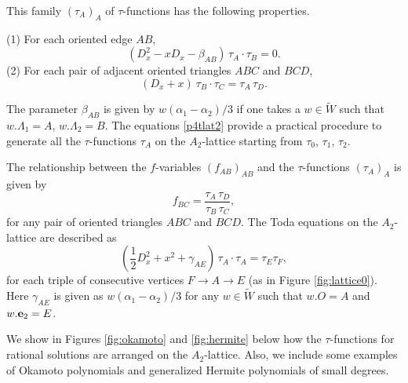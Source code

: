 {This family $(\tau_A)_{A}$ of $\tau$-functions has the 
following properties. 
\par\medskip\noindent
(1) For each oriented edge $AB$,
\begin{equation}\label{p4tlat1}
\left(D_x^2-xD_x-\beta_{AB}\right)
\,\tau_A\cdot \tau_B=0. 
\end{equation}
(2) For each pair of adjacent oriented triangles $ABC$ and 
$BCD$,  
\begin{equation}\label{p4tlat2}
(D_x+x) \ \tau_B\cdot\tau_C =\tau_A\,\tau_{D}. 
\end{equation}
\par\smallskip\noindent 
The parameter $\beta_{AB}$ is given by 
$w(\alpha_1-\alpha_2)/3$ if one takes a 
$w\in\widetilde{W}$ such that $w.\Lambda_1=A$, 
$w.\Lambda_2=B$. 
The equations \eqref{p4tlat2} provide a practical procedure 
to generate all the $\tau$-functions $\tau_A$ on 
the $A_2$-lattice starting from $\tau_0$, $\tau_1$, $\tau_2$. 
\par\medskip
The relationship between the $f$-variables $(f_{AB})_{AB}$ and 
the $\tau$-functions $(\tau_A)_{A}$ is given by 
\begin{equation}
f_{BC}=\frac{\tau_A\,\tau_{D}}{\tau_{B}\,\tau_{C}}, 
\end{equation}
for any pair of oriented triangles $ABC$ and $BCD$. 
The Toda equations on the $A_2$-lattice are described as
\begin{equation}
\left(\frac{1}{2}D_x^2 + x^2 +\gamma_{AE}\right)\, \tau_A\cdot\tau_A
=\tau_E \tau_F,
\end{equation}
for each triple of consecutive vertices $F\to A\to E$ (as in 
Figure \ref{fig:lattice0}). 
Here $\gamma_{AE}$ is given as
$w(\alpha_1-\alpha_2)/3$ 
for any $w\in\widetilde{W}$ such that 
$w.O=A$ and $w.{\mbox{\bf e}_2}=E$. 
} %
\par\medskip
We show in Figures \ref{fig:okamoto} and \ref{fig:hermite} below 
how the $\tau$-functions for rational solutions are arranged 
on the $A_2$-lattice.  
Also, we include some examples of Okamoto polynomials and 
generalized Hermite polynomials of small degrees. 
